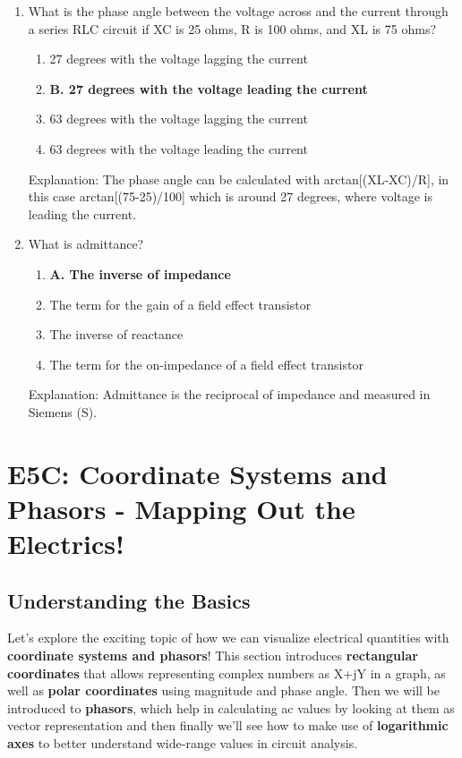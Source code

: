 \begin{enumerate}
   \item What is the phase angle between the voltage across and the current through a series RLC circuit if XC is 25 ohms, R is 100 ohms, and XL is 75 ohms?
    \begin{enumerate}
        \item  27 degrees with the voltage lagging the current
        \item \textbf{B. 27 degrees with the voltage leading the current}
      \item  63 degrees with the voltage lagging the current
       \item  63 degrees with the voltage leading the current
     \end{enumerate}
       \textcolor{myred}{Explanation:}
        The phase angle can be calculated with arctan[(XL-XC)/R], in this case arctan[(75-25)/100] which is around 27 degrees, where voltage is leading the current.

  \item What is admittance?
   \begin{enumerate}
    \item \textbf{A. The inverse of impedance}
        \item  The term for the gain of a field effect transistor
       \item  The inverse of reactance
      \item  The term for the on-impedance of a field effect transistor
   \end{enumerate}
      \textcolor{myred}{Explanation:}
      Admittance is the reciprocal of impedance and measured in Siemens (S).
\end{enumerate}

\section{E5C: Coordinate Systems and Phasors - Mapping Out the Electrics!}

\subsection*{Understanding the Basics}
Let’s explore the exciting topic of how we can visualize electrical quantities with \textcolor{myblue}{\textbf{coordinate systems and phasors}}! This section introduces \textcolor{myblue}{\textbf{rectangular coordinates}} that allows representing complex numbers as X+jY in a graph, as well as \textcolor{myblue}{\textbf{polar coordinates}} using magnitude and phase angle.  Then we will be introduced to \textcolor{myblue}{\textbf{phasors}}, which help in calculating ac values by looking at them as vector representation and then finally we'll see how to make use of \textcolor{myblue}{\textbf{logarithmic axes}} to better understand wide-range values in circuit analysis.

